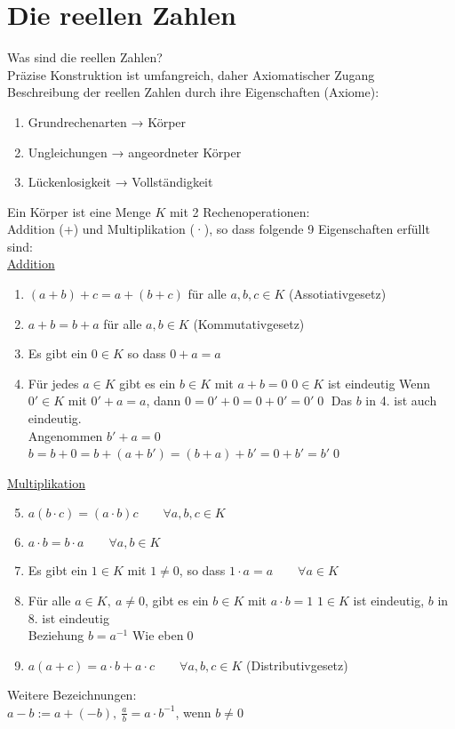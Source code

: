 \chapter{Die reellen Zahlen}
Was sind die reellen Zahlen?\\
Präzise Konstruktion ist umfangreich, daher Axiomatischer Zugang\\
Beschreibung der reellen Zahlen durch ihre Eigenschaften (Axiome):\\
\begin{enumerate}
\item{Grundrechenarten → Körper}
\item{Ungleichungen → angeordneter Körper}
\item{Lückenlosigkeit → Vollständigkeit}
\end{enumerate}
%
\Def
Ein Körper ist eine Menge $K$ mit 2 Rechenoperationen:\\
Addition (+) und Multiplikation (·), so dass folgende 9 Eigenschaften erfüllt sind:\\[8pt]
\underline{Addition}\\[-15pt]
\begin{enumerate}
\item{$(a+b)+c=a+(b+c)$ für alle $a,b,c\in K$ (Assotiativgesetz)}
\item{$a+b=b+a$ für alle $a,b\in K$ (Kommutativgesetz)}
\item{Es gibt ein $0\in K$ so dass $0+a=a$}
\item{Für jedes $a\in K$ gibt es ein $b\in K$ mit $a+b=0$}
\bem
$0\in K$ ist eindeutig
\bew
Wenn $0'\in K$ mit $0'+a=a$, dann $0=0'+0=0+0'=0'$\qed
\bem
Das $b$ in 4. ist auch eindeutig.\\
\bew
Angenommen $b'+a=0$\\
$b=b+0=b+(a+b')=(b+a)+b'=0+b'=b'$\qed
\end{enumerate}
\underline{Multiplikation}\\[-15pt]
\begin{enumerate}
\setcounter{enumi}{4}
\item{$a(b·c)=(a·b)c\qquad ∀a,b,c\in K$}
\item{$a·b=b·a\qquad ∀a,b\in K$}
\item{Es gibt ein $1\in K$ mit $1\neq 0$, so dass $1·a=a\qquad ∀a\in K$}
\item{Für alle $a\in K,\ a\neq 0$, gibt es ein $b\in K$ mit $a·b=1$}
\bem
$1\in K$ ist eindeutig, $b$ in 8. ist eindeutig\\
Beziehung $b=a^{-1}$
\bew
Wie eben\qed
\item{$a(a+c)=a·b+a·c\qquad ∀a,b,c\in K$ (Distributivgesetz)}
\end{enumerate}
Weitere Bezeichnungen:\\
$a-b:=a+(-b),\ \frac{a}{b}=a·b^{-1}$, wenn $b\neq 0$



